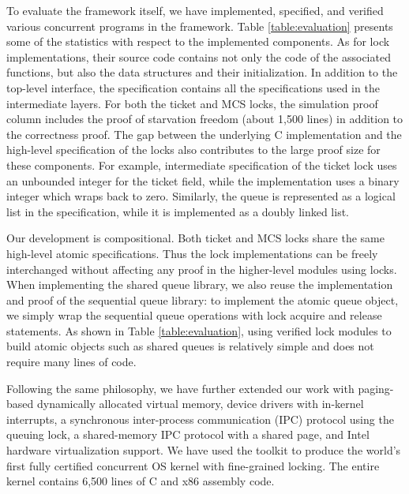 
To evaluate the framework itself, we have implemented, specified, and verified various
concurrent programs in the framework. Table \ref{table:evaluation} presents some of the
statistics with respect to the implemented components.
As for lock implementations,
their source code contains not only
the code of the associated functions,
but also the data structures and their initialization.
In addition to the top-level interface, the specification contains all the 
specifications used in the intermediate layers.
For both the ticket and MCS locks,
the simulation proof column
includes the proof of starvation freedom (about 1,500 lines) in addition to the correctness proof.
The gap between the underlying C implementation and the high-level specification of the locks
also contributes to the large proof size for these components.
For example, intermediate specification of the ticket lock uses an unbounded
integer for the ticket field,
while the implementation uses a binary integer
which wraps back to zero.
Similarly, the queue is represented as a logical list in the specification,
while it is implemented as a doubly linked list.

Our development is compositional. Both ticket  and MCS locks share the same
high-level atomic specifications.
Thus the lock implementations can be freely interchanged without affecting any proof
in the higher-level modules using locks. When implementing the shared queue library, we
also reuse the implementation and proof of the sequential queue library:
to implement the atomic queue object, we simply wrap the
sequential queue operations with lock acquire and release statements.
As shown in Table \ref{table:evaluation}, using verified lock modules to build
atomic objects such as shared queues is relatively simple and does not require
many lines of code.

Following the same philosophy, 
we have further extended our work with paging-based
dynamically allocated virtual
memory, device drivers with in-kernel interrupts, a synchronous inter-process
communication (IPC) protocol using the queuing lock, a shared-memory IPC protocol with
a shared page, and Intel hardware virtualization support.
We have used the toolkit to produce the world's
first fully certified concurrent OS kernel
with fine-grained locking. 
The entire kernel contains 6,500 lines
of C and x86 assembly code.


